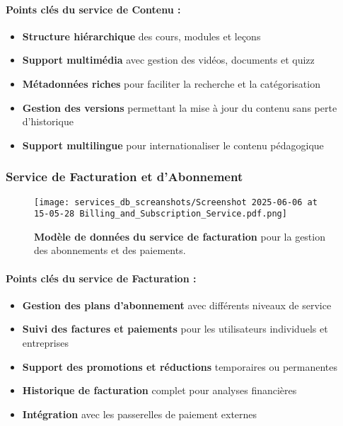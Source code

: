 \paragraph{Points clés du service de Contenu :}
\begin{itemize}[leftmargin=*,noitemsep,topsep=0pt]
  \item \textbf{Structure hiérarchique} des cours, modules et leçons
  \item \textbf{Support multimédia} avec gestion des vidéos, documents et quizz
  \item \textbf{Métadonnées riches} pour faciliter la recherche et la catégorisation
  \item \textbf{Gestion des versions} permettant la mise à jour du contenu sans perte d'historique
  \item \textbf{Support multilingue} pour internationaliser le contenu pédagogique
\end{itemize}
\normalsize
\newpage

\subsubsection{Service de Facturation et d'Abonnement}
\begin{figure}[h!]
  \centering
  \texttt{[image: services\_db\_screanshots/Screenshot 2025-06-06 at 15-05-28 Billing\_and\_Subscription\_Service.pdf.png]}
  \caption{\textbf{Modèle de données du service de facturation} pour la gestion des abonnements et des paiements.}
  \label{fig:billing_service}
\end{figure}
\vspace{-10pt}
\small
\paragraph{Points clés du service de Facturation :}
\begin{itemize}[leftmargin=*,noitemsep,topsep=0pt]
  \item \textbf{Gestion des plans d'abonnement} avec différents niveaux de service
  \item \textbf{Suivi des factures et paiements} pour les utilisateurs individuels et entreprises
  \item \textbf{Support des promotions et réductions} temporaires ou permanentes
  \item \textbf{Historique de facturation} complet pour analyses financières
  \item \textbf{Intégration} avec les passerelles de paiement externes
\end{itemize}
\normalsize
\newpage

